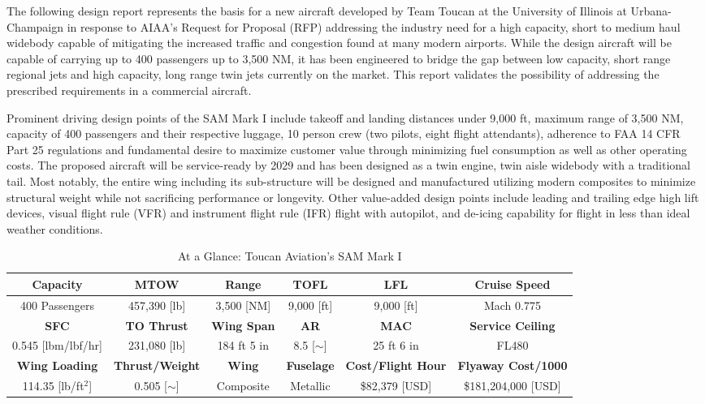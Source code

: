 
The following design report represents the basis for a new aircraft developed by Team Toucan at the University of Illinois at Urbana-Champaign in response to AIAA's Request for Proposal \cite{RFP} (RFP) addressing the industry need for a high capacity, short to medium haul widebody capable of mitigating the increased traffic and congestion found at many modern airports.  While the design aircraft will be capable of carrying up to 400 passengers up to 3,500 NM, it has been engineered to bridge the gap between low capacity, short range regional jets and high capacity, long range twin jets currently on the market.  This report validates the possibility of addressing the prescribed requirements in a commercial aircraft.

 Prominent driving design points of the SAM Mark I include takeoff and landing distances under 9,000 ft, maximum range of 3,500 NM, capacity of 400 passengers and their respective luggage, 10 person crew (two pilots, eight flight attendants), adherence to FAA 14 CFR Part 25 regulations and fundamental desire to maximize customer value through minimizing fuel consumption as well as other operating costs.  The proposed aircraft will be service-ready by 2029 and has been designed as a twin engine, twin aisle widebody with a traditional tail.  Most notably, the entire wing including its sub-structure will be designed and manufactured utilizing modern composites to minimize structural weight while not sacrificing performance or longevity.  Other value-added design points include leading and trailing edge high lift devices, visual flight rule (VFR) and instrument flight rule (IFR) flight with autopilot, and de-icing capability for flight in less than ideal weather conditions.

\begin{table}[!h] 
    \centering
    \caption{At a Glance: Toucan Aviation's SAM Mark I}
    \begin{tabular}{ |c|c|c|c|c|c| }\toprule
    \textbf{Capacity} & \textbf{MTOW} & \textbf{Range} & \textbf{TOFL} & \textbf{LFL} & \textbf{Cruise Speed} \\\hline 
    400 Passengers & 457,390 [lb] & 3,500 [NM] & 9,000 [ft] & 9,000 [ft] & Mach 0.775  \\\hline \hline
    \textbf{SFC} & \textbf{TO Thrust} & \textbf{Wing Span} & \textbf{AR} & \textbf{MAC} & \textbf{Service Ceiling}  \\\hline 
    0.545 [lbm/lbf/hr] & 231,080 [lb] & 184 ft 5 in & 8.5 [$\sim$] & 25 ft 6 in & FL480  \\\hline \hline
    \textbf{Wing Loading} & \textbf{Thrust/Weight} & \textbf{Wing} & \textbf{Fuselage} & \textbf{Cost/Flight Hour} & \textbf{Flyaway Cost/1000}  \\\hline 
    114.35 [lb/ft$^2$] & 0.505 [$\sim$] & Composite & Metallic & \$82,379 [USD] & \$181,204,000 [USD] \\ \bottomrule

    \end{tabular}\label{tab:ataglance}
\end{table}

